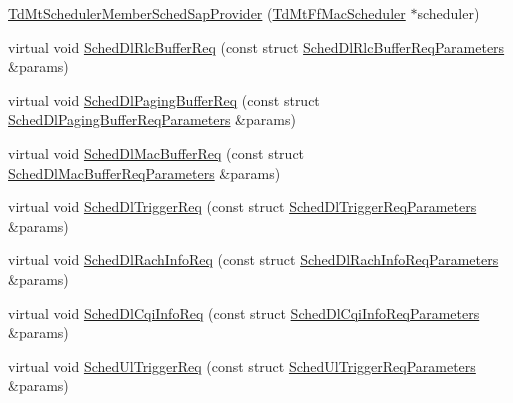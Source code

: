 \begin{DoxyCompactItemize}
\item 
\hyperlink{classns3_1_1TdMtSchedulerMemberSchedSapProvider_aa797edb97b5361dde66538a425e2ad2f}{Td\+Mt\+Scheduler\+Member\+Sched\+Sap\+Provider} (\hyperlink{classns3_1_1TdMtFfMacScheduler}{Td\+Mt\+Ff\+Mac\+Scheduler} $\ast$scheduler)
\item 
virtual void \hyperlink{classns3_1_1TdMtSchedulerMemberSchedSapProvider_a7dee824459f9778516f6ee59c32c8089}{Sched\+Dl\+Rlc\+Buffer\+Req} (const struct \hyperlink{structns3_1_1FfMacSchedSapProvider_1_1SchedDlRlcBufferReqParameters}{Sched\+Dl\+Rlc\+Buffer\+Req\+Parameters} \&params)
\item 
virtual void \hyperlink{classns3_1_1TdMtSchedulerMemberSchedSapProvider_aa1be900bee353b6928f03fa885477986}{Sched\+Dl\+Paging\+Buffer\+Req} (const struct \hyperlink{structns3_1_1FfMacSchedSapProvider_1_1SchedDlPagingBufferReqParameters}{Sched\+Dl\+Paging\+Buffer\+Req\+Parameters} \&params)
\item 
virtual void \hyperlink{classns3_1_1TdMtSchedulerMemberSchedSapProvider_a6279ab21ec31480656f8a79c7ca2377d}{Sched\+Dl\+Mac\+Buffer\+Req} (const struct \hyperlink{structns3_1_1FfMacSchedSapProvider_1_1SchedDlMacBufferReqParameters}{Sched\+Dl\+Mac\+Buffer\+Req\+Parameters} \&params)
\item 
virtual void \hyperlink{classns3_1_1TdMtSchedulerMemberSchedSapProvider_ade07de6a6d75b249f6935b97978cf152}{Sched\+Dl\+Trigger\+Req} (const struct \hyperlink{structns3_1_1FfMacSchedSapProvider_1_1SchedDlTriggerReqParameters}{Sched\+Dl\+Trigger\+Req\+Parameters} \&params)
\item 
virtual void \hyperlink{classns3_1_1TdMtSchedulerMemberSchedSapProvider_a48ba43ab61b4f59240edd5772d2d971a}{Sched\+Dl\+Rach\+Info\+Req} (const struct \hyperlink{structns3_1_1FfMacSchedSapProvider_1_1SchedDlRachInfoReqParameters}{Sched\+Dl\+Rach\+Info\+Req\+Parameters} \&params)
\item 
virtual void \hyperlink{classns3_1_1TdMtSchedulerMemberSchedSapProvider_a1972435ce804db8fcd5dd4990dc4c444}{Sched\+Dl\+Cqi\+Info\+Req} (const struct \hyperlink{structns3_1_1FfMacSchedSapProvider_1_1SchedDlCqiInfoReqParameters}{Sched\+Dl\+Cqi\+Info\+Req\+Parameters} \&params)
\item 
virtual void \hyperlink{classns3_1_1TdMtSchedulerMemberSchedSapProvider_ac458b36b57a338c1e8f4d74909f93db2}{Sched\+Ul\+Trigger\+Req} (const struct \hyperlink{structns3_1_1FfMacSchedSapProvider_1_1SchedUlTriggerReqParameters}{Sched\+Ul\+Trigger\+Req\+Parameters} \&params)

\end{DoxyCompactItemize}
